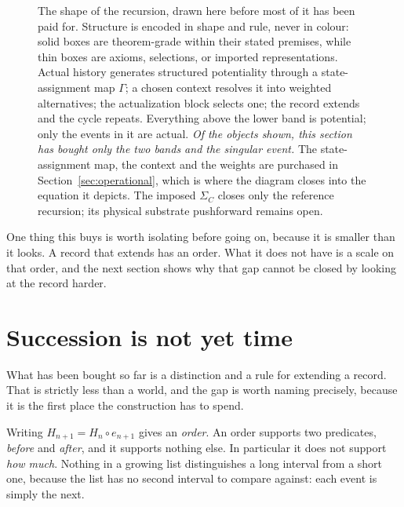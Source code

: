 \documentclass[11pt,a4paper]{article}
\newcommand{\figsub}{\scriptsize}
\theoremstyle{definition}
\theoremstyle{plain}
\theoremstyle{remark}
\begin{document}
\begin{figure}[t]
\caption{The shape of the recursion, drawn here before most of it has
been paid for. Structure is encoded in shape and rule, never in colour:
solid boxes are theorem-grade within their stated premises, while thin boxes
are axioms, selections, or imported representations. Actual history generates structured
potentiality through a state-assignment map $\Gamma$; a chosen context
resolves it into weighted alternatives; the actualization block selects
one; the record extends and the cycle repeats. Everything above the lower
band is potential; only the events in it are actual. \emph{Of the objects
shown, this section has bought only the two bands and the singular
event.} The state-assignment map, the context and the weights are
purchased in Section~\ref{sec:operational}, which is where the diagram
closes into the equation it depicts. The imposed $\Sigma_C$ closes only the
reference recursion; its physical substrate pushforward remains open.}
\label{fig:ontology}
\end{figure}

One thing this buys is worth isolating before going on, because it
is smaller than it looks. A record that extends has an order. What it
does not have is a scale on that order, and the next section shows why
that gap cannot be closed by looking at the record harder.

\section{Succession is not yet time}
\label{sec:succession}

What has been bought so far is a distinction and a rule for extending a
record. That is strictly less than a world, and the gap is worth naming
precisely, because it is the first place the construction has to spend.

Writing $H_{n+1} = H_n \circ e_{n+1}$ gives an \emph{order}. An order
supports two predicates, \emph{before} and \emph{after}, and it supports
nothing else. In particular it does not support \emph{how much}. Nothing
in a growing list distinguishes a long interval from a short one, because
the list has no second interval to compare against: each event is simply
the next.
\end{document}
